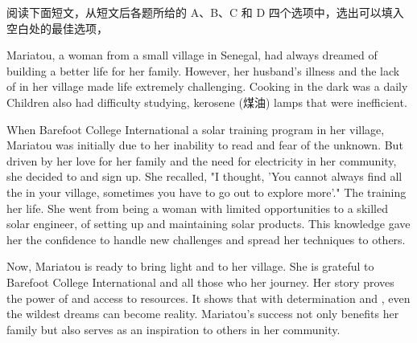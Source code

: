 \documentclass{英语试卷}
\begin{document}
\par 阅读下面短文，从短文后各题所给的 A、B、C 和 D 四个选项中，选出可以填入空白处的最佳选项，\par
\par Mariatou, a woman from a small village in Senegal, had always dreamed of building a better life for her family. However, her husband's illness and the lack of  in her village made life extremely challenging. Cooking in the dark was a daily  Children also had difficulty studying,  kerosene (煤油) lamps that were inefficient.\par
\par When Barefoot College International  a solar training program in her village, Mariatou was initially  due to her inability to read and fear of the unknown. But driven by her love for her family and the  need for electricity in her community, she decided to  and sign up. She recalled, "I thought, 'You cannot always find all the  in your village, sometimes you have to go out to explore more'." The training  her life. She went from being a woman with limited opportunities to a skilled solar engineer,  of setting up and maintaining solar products. This  knowledge gave her the confidence to handle new challenges and spread her techniques to others.\par
\par Now, Mariatou is ready to bring light and  to her village. She is grateful to Barefoot College International and all those who  her journey. Her story proves the power of  and access to resources. It shows that with determination and , even the wildest dreams can become reality. Mariatou's success not only benefits her family but also serves as an inspiration to others in her community.\par
{}
\end{document}
